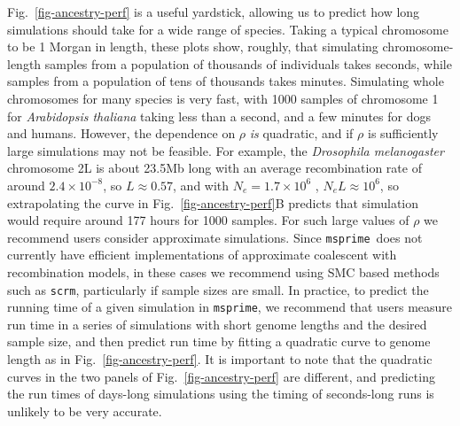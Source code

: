 \documentclass{article}
\newcommand{\msprime}[0]{\texttt{msprime}}
\newcommand{\scrm}[0]{\texttt{scrm}}
\begin{document}
Fig.~\ref{fig-ancestry-perf} is a useful yardstick, allowing us
to predict how long simulations should take for a wide range of
species. Taking a typical chromosome to be 1 Morgan in length,
these plots show, roughly, that simulating chromosome-length
samples from a population of thousands of individuals takes seconds,
while samples from a population of tens of thousands takes minutes.
Simulating whole chromosomes for many species is very fast,
with 1000 samples of chromosome 1 for
\emph{Arabidopsis thaliana} taking less than a second, and a few
minutes for dogs and humans. However, the dependence on $\rho$
\emph{is} quadratic, and if $\rho$ is sufficiently large simulations
may not be feasible. For example,
the \emph{Drosophila melanogaster} chromosome 2L
is about 23.5Mb long with an average recombination rate of around $2.4 \times 10^{-8}$,
so $L \approx 0.57$,
and with $N_e = 1.7 \times 10^6$ \citep{li2006inferring},
$N_e L \approx 10^6$, so extrapolating the curve in Fig.~\ref{fig-ancestry-perf}B
predicts that simulation would require around 177 hours for 1000 samples.
For such large values of $\rho$  we recommend
users consider approximate simulations. Since \msprime\ does not currently
have efficient implementations of approximate coalescent with recombination
models, in these cases we recommend using SMC based methods such as \scrm,
particularly if sample sizes are small.
In practice, to predict the running time of a given
simulation in \msprime, we recommend that users
measure run time in a series of simulations with short genome lengths and
the desired sample size,
and then predict run time by fitting a quadratic curve to genome length
as in Fig.~\ref{fig-ancestry-perf}.
It is important to note that the quadratic curves in the two
panels of Fig.~\ref{fig-ancestry-perf} are different, and
predicting the run times of days-long simulations
using the timing of seconds-long runs is unlikely to be very accurate.
\end{document}
